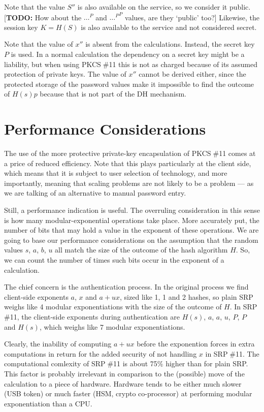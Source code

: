 \documentclass[a4paper,11pt]{article}
\def\pkcs11{PKCS$\;$\#11\xspace}
\def\srp11{SRP$\;$\#11\xspace}
\begin{document}
Note that the value $S''$ is also available on the service, so we consider it public.  [\textbf{TODO:} How about the $\ldots^P$ and ${\ldots^P}^P$ values, are they `public' too?]  Likewise, the session key $K=H(S)$ is also available to the service and not considered secret.

Note that the value of $x''$ is absent from the calculations.  Instead, the secret key $P$ is used.  In a normal calculation the dependency on a secret key might be a liability, but when using \pkcs11 this is not as charged because of its assumed protection of private keys.  The value of $x''$ cannot be derived either, since the protected storage of the password values make it impossible to find the outcome of $H(s)p$ because that is not part of the DH mechanism.


\section{Performance Considerations}

The use of the more protective private-key encapsulation of \pkcs11 comes at a price of reduced efficiency.  Note that this plays particularly at the client side, which means that it is subject to user selection of technology, and more importantly, meaning that scaling problems are not likely to be a problem --- as we are talking of an alternative to manual password entry.

Still, a performance indication is useful.  The overruling consideration in this sense is how many modular-exponential operations take place.  More accurately put, the number of bits that may hold a value in the exponent of these operations.  We are going to base our performance considerations on the assumption that the random values $s$, $a$, $b$, $u$ all match the size of the outcome of the hash algorithm $H$.  So, we can count the number of times such bits occur in the exponent of a calculation.

The chief concern is the authentication process.  In the original process we find client-side exponents $a$, $x$ and $a+ux$, sized like 1, 1 and 2 hashes, so plain SRP weighs like 4 modular exponentiations with the size of the outcome of $H$.  In \srp11, the client-side exponents during authentication are $H(s)$, $a$, $a$, $u$, $P$, $P$ and $H(s)$, which weighs like 7 modular exponentiations.

Clearly, the inability of computing $a+ux$ before the exponention forces in extra computations in return for the added security of not handling $x$ in \srp11.  The computational comlexity of \srp11 is about 75\% higher than for plain SRP.  This factor is probably irrelevant in comparison to the (possible) move of the calculation to a piece of hardware.  Hardware tends to be either much slower (USB token) or much faster (HSM, crypto co-processor) at performing modular exponentiation than a CPU.
\end{document}
